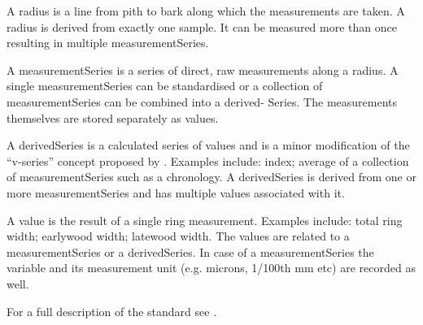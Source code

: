 \begin{description*}
\item[A radius] is a line from pith to bark along which the measurements are taken. A radius is derived from exactly one sample. It can be measured more than once resulting in multiple measurementSeries.

\item[A measurementSeries] is a series of direct, raw measurements along a radius. A single measurementSeries can be standardised or a collection of measurementSeries can be combined into a derived- Series. The measurements themselves are stored separately as values.

\item[A derivedSeries] is a calculated series of values and is a minor modification of the “v-series” concept proposed by \citet{corina}. Examples include: index; average of a collection of measurementSeries such as a chronology. A derivedSeries is derived from one or more measurementSeries and has multiple values associated with it.

\item[A value] is the result of a single ring measurement. Examples include: total ring width; earlywood width; latewood width. The values are related to a measurementSeries or a derivedSeries. In case of a measurementSeries the variable and its measurement unit (e.g. microns, 1/100th mm etc) are recorded as well. 
\end{description*}

For a full description of the standard see \citet{tridas}.

